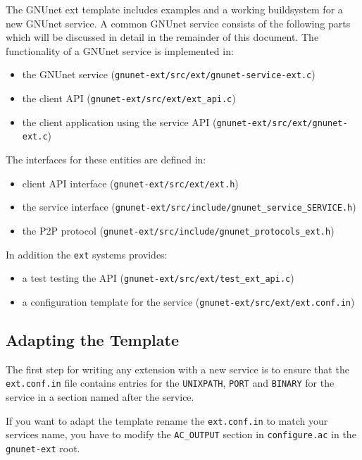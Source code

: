 \documentclass[10pt]{article}
\begin{document}
The GNUnet ext template includes examples and a working buildsystem for a new GNUnet service.
A common GNUnet service consists of the following parts which will be discussed in detail in the
remainder of this document. The functionality of a GNUnet service is implemented in:

\begin{itemize}
\itemsep0em
  \item the GNUnet service (\lstinline|gnunet-ext/src/ext/gnunet-service-ext.c|)
  \item the client API (\lstinline|gnunet-ext/src/ext/ext_api.c|)
  \item the client application using the service API (\lstinline|gnunet-ext/src/ext/gnunet-ext.c|) 


\end{itemize}

The interfaces for these entities are defined in:
\begin{itemize}
\itemsep0em
  \item client API interface (\lstinline|gnunet-ext/src/ext/ext.h|) 
  \item the service interface (\lstinline|gnunet-ext/src/include/gnunet_service_SERVICE.h|)
  \item the P2P protocol (\lstinline|gnunet-ext/src/include/gnunet_protocols_ext.h|)
\end{itemize}


In addition the \texttt{ext} systems provides:
\begin{itemize}
\itemsep0em
  \item a test testing the API (\lstinline|gnunet-ext/src/ext/test_ext_api.c|)
  \item a configuration template for the service (\lstinline|gnunet-ext/src/ext/ext.conf.in|)
\end{itemize}


\subsection{Adapting the Template}

The first step for writing any extension with a new service is to
ensure that the {\tt ext.conf.in} file contains entries for the
\texttt{UNIXPATH}, \texttt{PORT} and \texttt{BINARY} for the service in a section named after
the service. 

If you want to adapt the template rename the {\tt ext.conf.in} to match your 
services name, you have to modify the \texttt{AC\_OUTPUT} section in {\tt configure.ac} 
in the \texttt{gnunet-ext} root.
\end{document}
